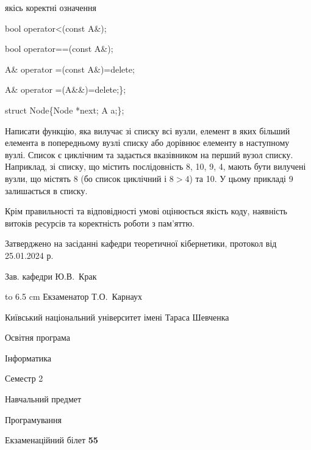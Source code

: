 \documentclass[12pt, ukrainian]{article}
\begin{document}
{\quad  якісь коректні означення 

\quad  bool operator<(const A\&); 

\quad  bool operator==(const A\&); 

\quad A\& operator =(const A\&)=delete; 

\quad  A\& operator =(A\&\&)=delete;\};

struct Node\{Node *next; A a;\};

 Написати функцію, яка вилучає зі списку всі вузли, елемент в яких більший елемента в попередньому вузлі списку або дорівнює елементу в наступному вузлі. Список є циклічним та задається вказівником на перший вузол списку. Наприклад, зі списку, що містить послідовність 8, 10, 9, 4, мають бути вилучені вузли, що містять 8 (бо список циклічний і $8>4$) та 10. У цьому прикладі 9 залишається в списку.

Крім правильності та відповідності умові оцінюється якість коду, наявність витоків ресурсів та коректність роботи з пам'яттю. 

}
{\smallskip\smallskip \begin {scriptsize} Затверджено на засіданні кафедри теоретичної кібернетики, протокол   від   25.01.2024 р.\par\smallskip\smallskip\smallskip\smallskip
{\parbox {6.5 cm} {Зав. кафедри \dotfill Ю.В.~Крак}}\hspace {0.7cm} {\hbox to 6.5 cm { Екзаменатор \dotfill Т.О.~Карнаух}} \end{scriptsize}}
\newpage
{{\begin {scriptsize}\par
{ \center  Київський національний університет імені Тараса Шевченка \par}
{\parbox {5 cm}{Освітня програма \hfill}{\parbox {7 cm}{Інформатика\hfill}}\parbox {6 cm}{\hfill Семестр 2}}\par
{\parbox {5 cm} {Навчальний предмет \hfill}\parbox {7 cm}{Програмування \hfill}\parbox {6cm}{\hfill}\par}\vspace{-15pt} \end{scriptsize}}{\center Екзаменаційний білет \No \textbf { 55 }\par}}
\end{document}
